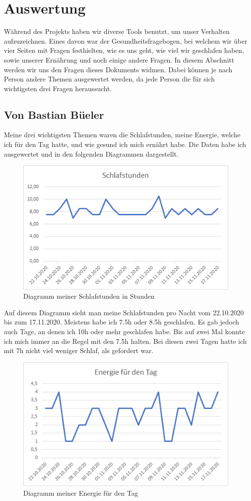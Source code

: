 \section{Auswertung}
\authortoc{\bastian}{\sectionident}
Während des Projekts haben wir diverse Tools benutzt, um unser Verhalten aufzuzeichnen. Eines davon war der Gesundheitsfragebogen, bei welchem wir über vier Seiten mit Fragen festhielten, wie es uns geht, wie viel wir geschlafen haben, sowie unserer Ernährung und noch einige andere Fragen. In diesem Abschnitt werden wir uns den Fragen dieses Dokuments widmen. Dabei können je nach Person andere Themen ausgewertet werden, da jede Person die für sich wichtigsten drei Fragen heraussucht.
\subsection{Von Bastian Büeler}
\authortoc{\bastian}{\subsectionident}
Meine drei wichtigsten Themen waren die Schlafstunden, meine Energie, welche ich für den Tag hatte, und wie gesund ich mich ernährt habe.
Die Daten habe ich ausgewertet und in den folgenden Diagrammen dargestellt.
\newline
\begin{figure}[H]
  \centering
  \includegraphics[width=0.7\linewidth]{./images/bastian_schlaf.png}
  \caption{Diagramm meiner Schlafstunden in Stunden}
\end{figure}
Auf diesem Diagramm sieht man meine Schlafstunden pro Nacht vom 22.10.2020 bis zum 17.11.2020. Meistens habe ich 7.5h oder 8.5h geschlafen. Es gab jedoch auch Tage, an denen ich 10h oder mehr geschlafen habe. Bis auf zwei Mal konnte ich mich immer an die Regel mit den 7.5h halten. Bei diesen zwei Tagen hatte ich mit 7h nicht viel weniger Schlaf, als gefordert war.
\newline
\begin{figure}[H]
  \centering
  \includegraphics[width=0.7\linewidth]{./images/bastian_energy.png}
  \caption{Diagramm meiner Energie für den Tag}
\end{figure}
